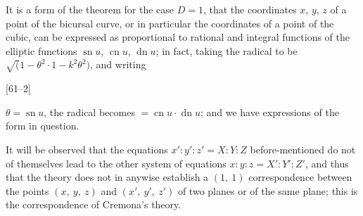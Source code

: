 \documentclass[12pt,a4paper,oneside]{book}
\newcommand{\paperref}[1]{\par\noindent\hfill[#1]\hfill\null\par}
\begin{document}
It is a form of the theorem for the case $D=1$, that the coordinates $x$, $y$, $z$ of a point of the bicursal curve, or in particular the coordinates of a point of the cubic, can be expressed as proportional to rational and integral functions of the elliptic functions $\operatorname{sn} u$, $\operatorname{cn} u$, $\operatorname{dn} u$; in fact, taking the radical to be $\surd(1-\theta^{2}\cdot 1-k^{2}\theta^{2})$, and writing

\paperref{61--2}
\newpage
$\theta=\operatorname{sn} u$, the radical becomes $=\operatorname{cn} u\cdot\operatorname{dn} u$; and we have expressions of the form in question.

It will be observed that the equations $x':y':z'=X:Y:Z$ before-mentioned do not of themselves lead to the other system of equations $x:y:z=X':Y':Z'$, and thus that the theory does not in anywise establish a $(1,\ 1)$ correspondence between the points $(x,\ y,\ z)$ and $(x',\ y',\ z')$ of two planes or of the same plane; this is the correspondence of Cremona's theory.
\end{document}
